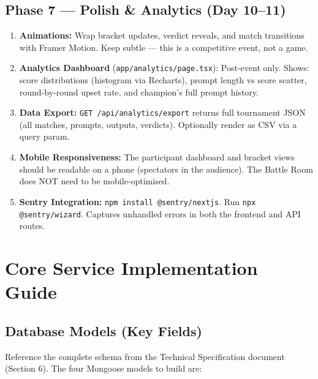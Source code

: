 \documentclass[11pt, a4paper]{article}
\begin{document}
\subsection{Phase 7 --- Polish \& Analytics (Day 10--11)}

\begin{enumerate}[leftmargin=1.5cm, itemsep=3pt]
    \item \textbf{Animations:} Wrap bracket updates, verdict reveals, and match transitions with Framer Motion. Keep subtle --- this is a competitive event, not a game.
    \item \textbf{Analytics Dashboard} (\texttt{app/analytics/page.tsx}): Post-event only. Shows: score distributions (histogram via Recharts), prompt length vs score scatter, round-by-round upset rate, and champion's full prompt history.
    \item \textbf{Data Export:} \texttt{GET /api/analytics/export} returns full tournament JSON (all matches, prompts, outputs, verdicts). Optionally render as CSV via a query param.
    \item \textbf{Mobile Responsiveness:} The participant dashboard and bracket views should be readable on a phone (spectators in the audience). The Battle Room does NOT need to be mobile-optimised.
    \item \textbf{Sentry Integration:} \texttt{npm install @sentry/nextjs}. Run \texttt{npx @sentry/wizard}. Captures unhandled errors in both the frontend and API routes.
\end{enumerate}

\section{Core Service Implementation Guide}

\subsection{Database Models (Key Fields)}

Reference the complete schema from the Technical Specification document (Section 6). The four Mongoose models to build are:
\end{document}
